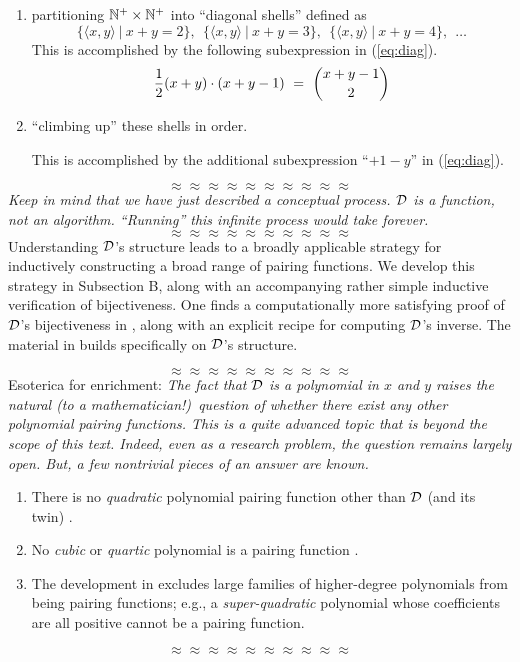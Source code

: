 \begin{enumerate}
\item
partitioning $\mathbb{N}^+ \times \mathbb{N}^+$ into ``diagonal shells'' defined as
\[
\{ \langle x,y \rangle \ | \ x+y = 2 \}, \ \ 
\{ \langle x,y \rangle \ | \ x+y = 3 \}, \ \ 
\{ \langle x,y \rangle \ | \ x+y = 4 \}, \ \ \ldots
\]
This is accomplished by the following subexpression in (\ref{eq:diag}).
\[
{1 \over 2} (x+y) \cdot (x+y-1) \ = \ {{x+y-1} \choose 2}
\]

\item
``climbing up'' these shells in order.

This is accomplished by the additional subexpression ``$+1-y$'' in
(\ref{eq:diag}).
\end{enumerate}
\[ \approx \approx \approx \approx \approx \approx \approx \approx \approx \approx \]
{\em Keep in mind that we have just described a {\em conceptual}
  process.  $\mbox{$\cal D$}$ is a function, {\em not} an algorithm.  ``Running''
  this infinite process would take forever.}
\[ \approx \approx \approx \approx \approx \approx \approx \approx \approx \approx \]
Understanding $\mbox{$\cal D$}$'s structure leads to a broadly applicable strategy
for inductively constructing a broad range of pairing functions.  We
develop this strategy in Subsection B, along with an accompanying
rather simple inductive verification of bijectiveness.  One finds a
computationally more satisfying proof of $\mbox{$\cal D$}$'s bijectiveness in
\cite{Davis58}, along with an explicit recipe for computing $\mbox{$\cal D$}$'s
inverse.  The material in \cite{Davis58} builds specifically on $\mbox{$\cal D$}$'s
structure.

\medskip

\[ \approx \approx \approx \approx \approx \approx \approx \approx \approx \approx \]
{\small\sf Esoterica for enrichment:}
{\em The fact that $\mbox{$\cal D$}$ is a {\em polynomial} in $x$ and $y$ raises
  the natural (to a mathematician!)~question of whether there exist
  any other polynomial pairing functions.  This is a quite advanced
  topic that is beyond the scope of this text.  Indeed, even as a
  research problem, the question remains largely open.  But, a few
  nontrivial pieces of an answer are known.}
\begin{enumerate}
\item
There is no {\em quadratic} polynomial pairing function other than
$\mbox{$\cal D$}$ (and its twin) \cite{FueterP23,LewR78a}.
\item
No {\em cubic} or {\em quartic} polynomial is a pairing function
\cite{LewR78b}.
\item
The development in \cite{LewR78b} excludes large families of
higher-degree polynomials from being pairing functions; e.g., a {\em
  super-quadratic} polynomial whose coefficients are all positive
cannot be a pairing function.
\end{enumerate}
\[ \approx \approx \approx \approx \approx \approx \approx \approx \approx \approx \]


